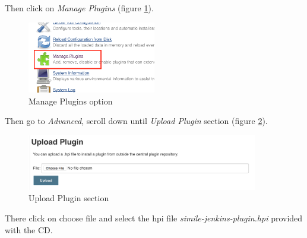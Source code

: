 Then click on \textit{Manage Plugins} (figure \ref{fig:jenkins-plugin-02}).

\begin{figure}[H]
	\centering
    \includegraphics[width=0.5\textwidth]{grafiken/jenkins-plugin-02}
    \caption{Manage Plugins option}
    \label{fig:jenkins-plugin-02}
\end{figure}

Then go to \textit{Advanced}, scroll down until \textit{Upload Plugin} section (figure \ref{fig:jenkins-plugin-03}).

\begin{figure}[H]
	\centering
    \includegraphics[width=0.9\textwidth]{grafiken/jenkins-plugin-03}
    \caption{Upload Plugin section}
    \label{fig:jenkins-plugin-03}
\end{figure}

There click on choose file and select the hpi file \textit{simile-jenkins-plugin.hpi} provided with the CD.